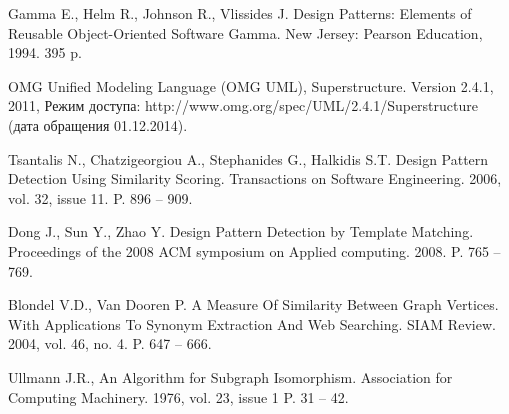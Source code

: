 \begin{thebibliography}{1}

\begin{flushleft}
Gamma E., Helm R., Johnson R., Vlissides J. Design Patterns: Elements of Reusable Object-Oriented Software Gamma. New Jersey: Pearson Education, 1994. 395 p.
\end{flushleft}

\begin{flushleft}
OMG Unified Modeling Language (OMG UML), Superstructure. Version 2.4.1, 2011, Режим доступа: http://www.omg.org/spec/UML/2.4.1/Superstructure (дата обращения 01.12.2014).
\end{flushleft}

\begin{flushleft}
Tsantalis N., Chatzigeorgiou A., Stephanides G., Halkidis S.T. Design Pattern Detection Using Similarity Scoring. Transactions on Software Engineering. 2006, vol. 32, issue 11. P. 896 – 909.
\end{flushleft}

\begin{flushleft}
Dong J., Sun Y., Zhao Y. Design Pattern Detection by Template Matching. Proceedings of the 2008 ACM symposium on Applied computing. 2008. P. 765 – 769.
\end{flushleft}

\begin{flushleft}
Blondel V.D., Van Dooren P. A Measure Of Similarity Between Graph Vertices. With Applications To Synonym Extraction And Web Searching. SIAM Review. 2004, vol. 46, no. 4. P. 647 – 666.
\end{flushleft}

\begin{flushleft}
Ullmann J.R., An Algorithm for Subgraph Isomorphism. Association for Computing Machinery. 1976, vol. 23, issue 1 P. 31 – 42.
\end{flushleft}

\end{thebibliography}
